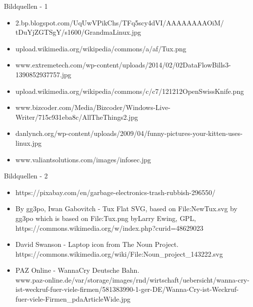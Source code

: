 \begin{frame}{Bildquellen - 1}
	\scriptsize{
			\begin{itemize}
			\item [1] 2.bp.blogspot.com/\textunderscore UqUwVPikChs/TFq5scy4dVI/AAAAAAAAOiM/\\tDuYjZGTSgY/s1600/GrandmaLinux.jpg
			
			\item [2] upload.wikimedia.org/wikipedia/commons/a/af/Tux.png
			
			\item [3] www.extremetech.com/wp-content/uploads/2014/02/02DataFlowBills3-1390852937757.jpg
			
			\item [4] upload.wikimedia.org/wikipedia/commons/c/c7/121212\textunderscore OpenSwissKnife.png
			
			\item [5] www.bizcoder.com/Media/Bizcoder/Windows-Live-Writer/715c931eba8c/AllTheThings\textunderscore 2.jpg
			
			\item [6] danlynch.org/wp-content/uploads/2009/04/funny-pictures-your-kitten-uses-linux.jpg
			
			\item [7] www.valiantsolutions.com/images/infosec.jpg
		\end{itemize}
	}
\end{frame}

\begin{frame}{Bildquellen - 2}
	\scriptsize{
			\begin{itemize}
			\item [8] https://pixabay.com/en/garbage-electronics-trash-rubbish-296550/
			
			\item [9] By gg3po, Iwan Gabovitch - Tux Flat SVG, based on File:NewTux.svg by gg3po which is based on File:Tux.png byLarry Ewing, GPL, 
			https://commons.wikimedia.org/w/index.php?curid=48629023
			
			\item [10] David Swanson - Laptop icon from The Noun Project. 
			https://commons.wikimedia.org/wiki/File:Noun\_project\_143222.svg
			
			\item [11] PAZ Online - WannaCry Deutsche Bahn.\\
			www.paz-online.de/var/storage/images/rnd/wirtschaft/uebersicht/wanna-cry-ist-weckruf-fuer-viele-firmen/581383990-1-ger-DE/Wanna-Cry-ist-Weckruf-fuer-viele-Firmen\_pdaArticleWide.jpg
		\end{itemize}
	}
\end{frame}
